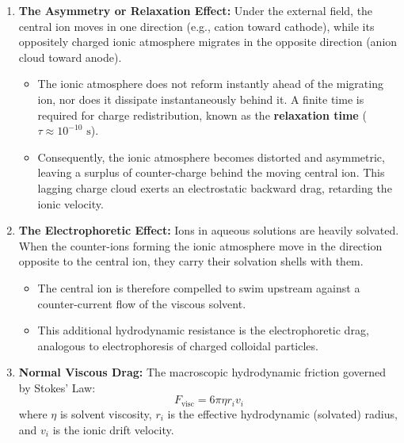 \begin{enumerate}[leftmargin=*]
    \item \textbf{The Asymmetry or Relaxation Effect:}
    Under the external field, the central ion moves in one direction (e.g., cation toward cathode), while its oppositely charged ionic atmosphere migrates in the opposite direction (anion cloud toward anode).
    \begin{itemize}
        \item The ionic atmosphere does not reform instantly ahead of the migrating ion, nor does it dissipate instantaneously behind it. A finite time is required for charge redistribution, known as the \textbf{relaxation time} ($\tau \approx 10^{-10}\text{ s}$).
        \item Consequently, the ionic atmosphere becomes distorted and asymmetric, leaving a surplus of counter-charge behind the moving central ion. This lagging charge cloud exerts an electrostatic backward drag, retarding the ionic velocity.
    \end{itemize}

    \item \textbf{The Electrophoretic Effect:}
    Ions in aqueous solutions are heavily solvated. When the counter-ions forming the ionic atmosphere move in the direction opposite to the central ion, they carry their solvation shells with them. 
    \begin{itemize}
        \item The central ion is therefore compelled to swim upstream against a counter-current flow of the viscous solvent.
        \item This additional hydrodynamic resistance is the electrophoretic drag, analogous to electrophoresis of charged colloidal particles.
    \end{itemize}

    \item \textbf{Normal Viscous Drag:}
    The macroscopic hydrodynamic friction governed by Stokes' Law:
    \begin{equation}
        F_{\text{visc}} = 6 \pi \eta r_i v_i
    \end{equation}
    where $\eta$ is solvent viscosity, $r_i$ is the effective hydrodynamic (solvated) radius, and $v_i$ is the ionic drift velocity.
\end{enumerate}

